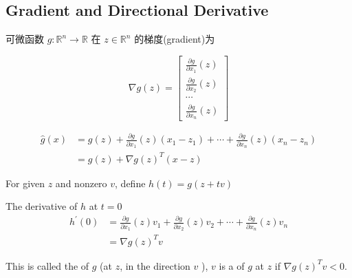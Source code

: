 \subsection{Gradient and Directional Derivative}

\begin{definition}
    可微函数 $ g: \mathbb{R}^{n} \rightarrow \mathbb{R} $ 在 $ z \in \mathbb{R}^{n} $ 的梯度(gradient)为

\begin{equation}
\nabla g(z)=\left[\begin{array}{c}
\frac{\partial g}{\partial x_{1}}(z) \\
\frac{\partial g}{\partial x_{2}}(z) \\
\cdots \\
\frac{\partial g}{\partial x_{n}}(z)
\end{array}\right]
\end{equation}
\end{definition}

\begin{definition}
    \begin{equation} \begin{aligned} \hat{g}(x) &=g(z)+\frac{\partial g}{\partial x_{1}}(z)\left(x_{1}-z_{1}\right)+\cdots+\frac{\partial g}{\partial x_{n}}(z)\left(x_{n}-z_{n}\right) \\ &=g(z)+\nabla g(z)^{T}(x-z) \end{aligned} \end{equation}
\end{definition}

\begin{definition}
    For given $ z $ and nonzero $ v $, define $ h(t)=g(z+t v) $

   The derivative of $ h $ at $ t=0 $
\begin{equation}
\begin{aligned}
h^{\prime}(0) &=\frac{\partial g}{\partial x_{1}}(z) v_{1}+\frac{\partial g}{\partial x_{2}}(z) v_{2}+\cdots+\frac{\partial g}{\partial x_{n}}(z) v_{n} \\
&=\nabla g(z)^{T} v
\end{aligned}
\end{equation}

This is called the  of $ g $ (at $ z $, in the direction $ v $ ), $ v $ is a  of $ g $ at $ z $ if $ \nabla g(z)^{T} v<0 $.
\end{definition}

